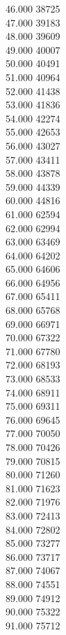 { 46.000	38725 \\
 47.000	39183 \\
 48.000	39609 \\
 49.000	40007 \\
 50.000	40491 \\
 51.000	40964 \\
 52.000	41438 \\
 53.000	41836 \\
 54.000	42274 \\
 55.000	42653 \\
 56.000	43027 \\
 57.000	43411 \\
 58.000	43878 \\
 59.000	44339 \\
 60.000	44816 \\
 61.000	62594 \\
 62.000	62994 \\
 63.000	63469 \\
 64.000	64202 \\
 65.000	64606 \\
 66.000	64956 \\
 67.000	65411 \\
 68.000	65768 \\
 69.000	66971 \\
 70.000	67322 \\
 71.000	67780 \\
 72.000	68193 \\
 73.000	68533 \\
 74.000	68911 \\
 75.000	69311 \\
 76.000	69645 \\
 77.000	70050 \\
 78.000	70426 \\
 79.000	70815 \\
 80.000	71260 \\
 81.000	71623 \\
 82.000	71976 \\
 83.000	72413 \\
 84.000	72802 \\
 85.000	73277 \\
 86.000	73717 \\
 87.000	74067 \\
 88.000	74551 \\
 89.000	74912 \\
 90.000	75322 \\
 91.000	75712 \\
}
